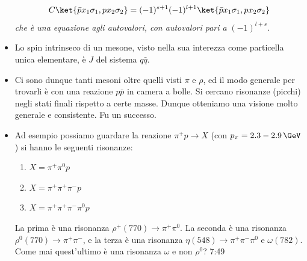 \begin{itemize}
    \begin{equation*}
    C\ket{\bar px_1\sigma_1,px_2\sigma_2}=(-1)^{s+1}(-1)^{l+1}\ket{\bar px_1\sigma_1,px_2\sigma_2}
    \end{equation*}
    \textit{che è una equazione agli autovalori, con autovalori pari a }$(-1)^{l+s}$.
    \item Lo spin intrinseco di un mesone, visto nella sua interezza come particella unica elementare, è $J$ del sistema $q\bar q$.
    \item Ci sono dunque tanti mesoni oltre quelli visti $\pi$ e $\rho$, ed il modo generale per trovarli è con una reazione $p\bar p$ in camera a bolle. Si cercano risonanze (picchi) negli stati finali rispetto a certe masse. Dunque otteniamo una visione molto generale e consistente. Fu un successo.
    \item Ad esempio possiamo guardare la reazione $\pi^+p\to X$ (con $p_\pi=2.3-2.9\,\GeV$) si hanno le seguenti risonanze:
    \begin{enumerate}
    \item $X=\pi^+\pi^0p$
    \item $X=\pi^+\pi^+\pi^-p$
    \item $X=\pi^+\pi^+\pi^-\pi^0p$
    \end{enumerate}
    La prima è una risonanza $\rho^+(770)\to\pi^+\pi^0$. La seconda è una risonanza $\rho^0(770)\to\pi^+\pi^-$, e la terza è una risonanza $\eta(548)\to\pi^+\pi^-\pi^0$ e $\omega(782)$. Come mai quest'ultimo è una risonanza $\omega$ e non $\rho^0$? 7:49
\end{itemize}
